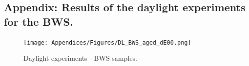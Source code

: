 \begin{appendices}

\newpage
\section[\hspace{0.3cm}Results of the daylight experiments for the \gls{BWS}]{ Appendix: Results of the daylight experiments for the \gls{BWS}.}
\label{app:ch4_DL_BW1_dEOO}

\begin{figure}[!h]
\centering
\texttt{[image: Appendices/Figures/DL\_BWS\_aged\_dE00.png]}
\caption*{Daylight experiments - \gls{BWS} samples.}
\label{fig:DL_BWS_aged_dE00}
\end{figure}

\end{appendices}